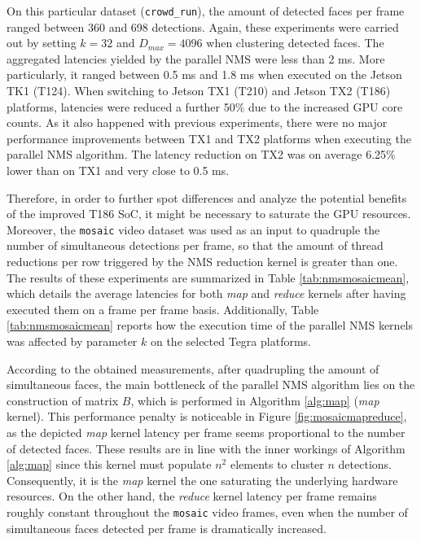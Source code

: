 On this particular dataset (\texttt{crowd\_run}), the amount of detected faces per frame ranged between 360 and 698 detections. Again, these experiments 
were carried out by setting $k=32$ and $D_{max}=4096$ when clustering detected faces. The aggregated latencies yielded by the parallel NMS were 
less than 2 ms. More particularly, it ranged between 0.5 ms and 1.8 ms when executed on the Jetson TK1 (T124). When switching to Jetson TX1 (T210) and 
Jetson TX2 (T186) platforms, latencies were reduced a further 50\% due to the increased GPU core counts. As it also happened with previous experiments, there 
were no major performance improvements between TX1 and TX2 platforms when executing the parallel NMS algorithm. The latency reduction on TX2 was on 
average 6.25\% lower than on TX1 and very close to 0.5 ms. 

Therefore, in order to further spot differences and analyze the potential benefits of the improved T186 SoC, it might be necessary to 
saturate the GPU resources. Moreover, the \texttt{mosaic} video dataset was used as an input to quadruple the number of simultaneous detections 
per frame, so that the amount of thread reductions per row triggered by the NMS reduction kernel is greater than one. The results of 
these experiments are summarized in Table \ref{tab:nmsmosaicmean}, which details the average latencies for both \emph{map} and \emph{reduce} kernels 
after having executed them on a frame per frame basis. Additionally, Table \ref{tab:nmsmosaicmean} reports how the execution time of the parallel NMS kernels 
was affected by parameter $k$ on the selected Tegra platforms. 

According to the obtained measurements, after quadrupling the amount of simultaneous faces, the main bottleneck of the parallel 
NMS algorithm lies on the construction of matrix $B$, which is performed in Algorithm \ref{alg:map} (\emph{map} kernel). This 
performance penalty is noticeable in Figure \ref{fig:mosaicmapreduce}, as the depicted \emph{map} kernel latency per frame seems  
proportional to the number of detected faces. These results are in line with the inner workings of Algorithm \ref{alg:map} since 
this kernel must populate $n^2$ elements to cluster $n$ detections. Consequently, it is the \emph{map} kernel the one saturating 
the underlying hardware resources. On the other hand, the \emph{reduce} kernel latency per frame remains roughly constant throughout 
the \texttt{mosaic} video frames, even when the number of simultaneous faces detected per frame is dramatically increased.

